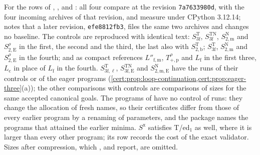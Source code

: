 For the rows of , ,
 and : all four compare at the
revision \texttt{7a7633980d}, with the four incoming archives of that revision, and
measure under CPython 3.12.14;  notes that a later revision,
\texttt{efe8812fb3}, files the same two archives and changes no baseline. The
controls are reproduced with identical text: $S^{\mathrm T}_{3\mathrm f}$,
$S^{\mathrm{TN}}_{3\mathrm f}$, $S^{\mathrm N}_{2,\mathrm m}$ and
$S^{\rho}_{2,\mathrm E}$ in the first, the second and the third, the last also with
$S^{\mathrm T}_{2,\mathrm b}$; $S^{\mathrm T}_{3\mathrm f}$, $S^{\mathrm N}_{2,\mathrm m}$
and $S^{\rho}_{2,\mathrm E}$ in the fourth; and as compact references
$L''_{\mathrm{f,m}}$, $T^{\rho}_{+,\mathrm p}$ and $L_{\mathrm f}$ in the first three,
$L_{\mathrm c}$ in place of $L_{\mathrm f}$ in the fourth. $S^{\mathrm T}_{3\mathrm f,\ell}$,
$S^{\mathrm{TN}}_{3\mathrm f,\mathrm E}$ and $S^{\mathrm N}_{2,\mathrm{m,E}}$ have the runs
of their controls or of the eager programs
(\cref{cert:prop:loop-continuation,cert:prop:eager-three}(a)); the other comparisons
with controls are comparisons of sizes for the same accepted canonical goals. The
programs of  have no control of runs: they change the allocation of
fresh names, so their certificates differ from those of every earlier program by a
renaming of parameters, and the package names the programs that attained the earlier
minima. $S^{\mathrm x}$ satisfies T/ed$_1$ as well, where it is larger than every
other program; its row records the cost of the exact validator. Sizes after
compression, which ,  and
 report, are omitted.

